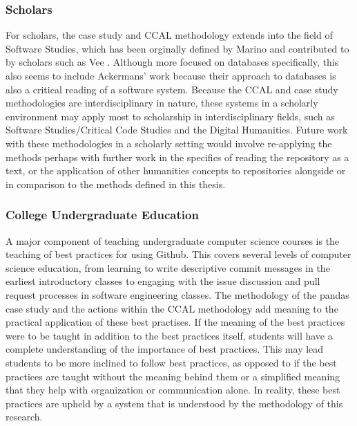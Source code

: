 \subsubsection{Scholars}

For scholars, the case study and CCAL methodology extends into the field of Software Studies, which has been orginally defined by Marino \cite{marino2020critical} and contributed to by scholars such as Vee \cite{vee2017coding}. Although more focused on databases specifically, this also seems to include Ackermans' work \cite{ackermans2020appeal} because their approach to databases is also a critical reading of a software system. Because the CCAL and case study methodologies are interdisciplinary in nature, these systems in a scholarly environment may apply most to scholarship in interdisciplinary fields, such as Software Studies/Critical Code Studies and the Digital Humanities. Future work with these methodologies in a scholarly setting would involve re-applying the methods perhaps with further work in the specifics of reading the repository as a text, or the application of other humanities concepts to repositories alongside or in comparison to the methods defined in this thesis. 

\subsubsection{College Undergraduate Education}

A major component of teaching undergraduate computer science courses is the teaching of best practices for using Github. This covers several levels of computer science education, from learning to write descriptive commit messages in the earliest introductory classes to engaging with the issue discussion and pull request processes in software engineering classes. The methodology of the pandas case study and the actions within the CCAL methodology add meaning to the practical application of these best practises. If the meaning of the best practices were to be taught in addition to the best practices itself, students will have a complete understanding of the importance of best practices. This may lead students to be more inclined to follow best practices, as opposed to if the best practices are taught without the meaning behind them or a simplified meaning that they help with organization or communication alone. In reality, these best practices are upheld by a system that is understood by the methodology of this research. 

